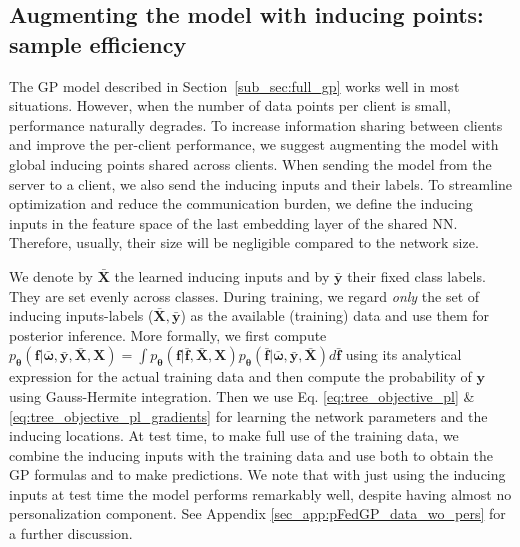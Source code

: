 \documentclass{article}
\def\Secref#1{Section~\ref{#1}}
\newcommand{\bld}[1]{\boldsymbol{#1}}
\def\rvf{{\mathbf{f}}}
\def\rvy{{\mathbf{y}}}
\def\rmX{{\mathbf{X}}}
\newcommand{\rvomega}{\bld{\mathbf{\omega}}}
\newcommand{\NNP}{\mathbf{\theta}}
\newcommand{\rmXbar}{\bar{\mathbf{\mathbf{X}}}}
\newcommand{\rvybar}{\bar{\mathbf{\mathbf{y}}}}
\begin{document}
\subsection{Augmenting the model with inducing points: sample efficiency} \label{subsec_method:gp_IP-data}
The GP model described in \Secref{sub_sec:full_gp} works well in most situations. However, when the number of data points per client is small, performance naturally degrades. To increase information sharing between clients and improve the per-client performance, we suggest augmenting the model with global inducing points shared across clients. When sending the model from the server to a client, we also send the inducing inputs and their labels. To streamline optimization and reduce the communication burden, we define the inducing inputs in the feature space of the last embedding layer of the shared NN. Therefore, usually, their size will be negligible compared to the network size. 

We denote by $\rmXbar$ the learned inducing inputs and by $\rvybar$ their fixed class labels. They are set evenly across classes. During training, we  regard \textit{only} the set of inducing inputs-labels ($\rmXbar, \rvybar$) as the available (training) data and use them for posterior inference. More formally, we first compute  $p_{\NNP}(\rvf | \bar{\rvomega}, \bar{\rvy}, \bar{\rmX}, \rmX)=\int p_{\NNP}(\rvf | \bar{\rvf}, \bar{\rmX}, \rmX)p_{\NNP}(\bar{\rvf} | \bar{\rvomega}, \bar{\rvy}, \bar{\rmX})d\bar{\rvf}$ using its analytical expression for the actual training data and then compute the probability of $\rvy$ using Gauss-Hermite integration. Then we use Eq. \ref{eq:tree_objective_pl} \& \ref{eq:tree_objective_pl_gradients} for learning the network parameters and the inducing locations.
At test time, to make full use of the training data, we combine the inducing inputs with the training data and use both to obtain the GP formulas and to make predictions. We note that with just using the inducing inputs at test time the model performs remarkably well, despite having almost no personalization component.
See Appendix \ref{sec_app:pFedGP_data_wo_pers} for a further discussion.
\end{document}
